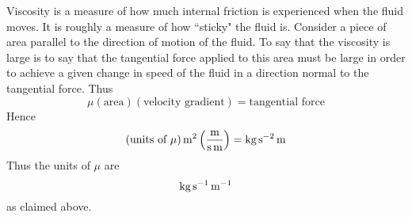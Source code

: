 Viscosity is a measure of how much internal friction is experienced when the
fluid moves. It is roughly a measure of how \textquotedblleft sticky" the
fluid is. Consider a piece of area parallel to the direction of motion of
the fluid. To say that the viscosity is large is to say that the tangential
force applied to this area must be large in order to achieve a given change
in speed of the fluid in a direction normal to the tangential force. Thus
\begin{equation*}
\mu (\text{area}) (\text{velocity gradient}) =\text{
tangential force}
\end{equation*}
Hence
\begin{equation*}
(\mbox{\rm units of $\mu$}) \mathop{\textrm{\rm m}}\nolimits^2\left(\frac{\mathop{\textrm{\rm m}}\nolimits}{\mathop{\textrm{\rm s}}\nolimits \mathop{\textrm{\rm m}}\nolimits}\right)
=\mathop{\textrm{\rm kg}}\nolimits\mathop{\textrm{\rm s}}\nolimits^{-2}\mathop{\textrm{\rm m}}\nolimits
\end{equation*}
Thus the units of $\mu $ are
\begin{equation*}
\mathop{\textrm{\rm kg}}\nolimits\mathop{\textrm{\rm s}}\nolimits^{-1}\mathop{\textrm{\rm m}}\nolimits^{-1}
\end{equation*}
as claimed above.

